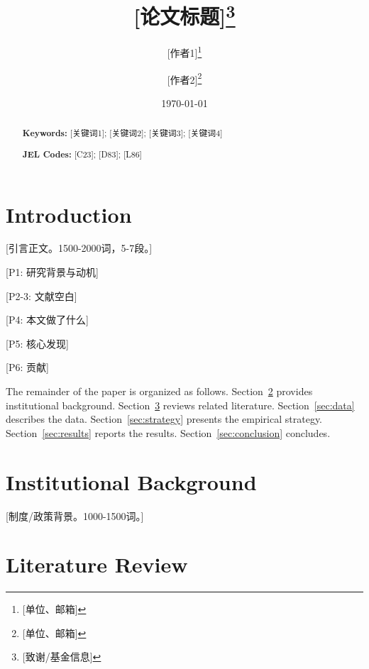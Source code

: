 \documentclass[12pt,a4paper]{article}
\title{\textbf{[论文标题]}\thanks{[致谢/基金信息]}}
\author{
    [作者1]\thanks{[单位、邮箱]} \and
    [作者2]\thanks{[单位、邮箱]}
}
\date{\today}
\begin{document}
\maketitle

\begin{abstract}

\medskip
\noindent\textbf{Keywords:} [关键词1]; [关键词2]; [关键词3]; [关键词4]

\noindent\textbf{JEL Codes:} [C23]; [D83]; [L86]
\end{abstract}

\newpage

\section{Introduction}

[引言正文。1500-2000词，5-7段。]

[P1: 研究背景与动机]

[P2-3: 文献空白]

[P4: 本文做了什么]

[P5: 核心发现]

[P6: 贡献]

The remainder of the paper is organized as follows. Section~\ref{sec:background} provides institutional background. Section~\ref{sec:literature} reviews related literature. Section~\ref{sec:data} describes the data. Section~\ref{sec:strategy} presents the empirical strategy. Section~\ref{sec:results} reports the results. Section~\ref{sec:conclusion} concludes.


\section{Institutional Background}\label{sec:background}

[制度/政策背景。1000-1500词。]


\section{Literature Review}\label{sec:literature}
\end{document}
